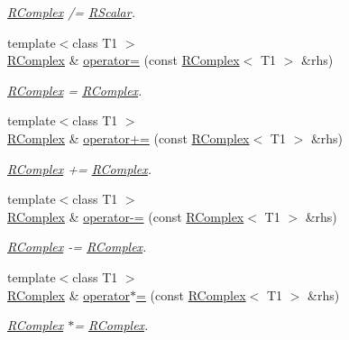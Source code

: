 \begin{DoxyCompactItemize}
\begin{DoxyCompactList}\small\item\em \mbox{\hyperlink{classENSEM_1_1RComplex}{R\+Complex}} /= \mbox{\hyperlink{classENSEM_1_1RScalar}{R\+Scalar}}. \end{DoxyCompactList}\item 
{\footnotesize template$<$class T1 $>$ }\\\mbox{\hyperlink{classENSEM_1_1RComplex}{R\+Complex}} \& \mbox{\hyperlink{classENSEM_1_1RComplex_a14a5d3857ebb326ed5f211cc30da3ced}{operator=}} (const \mbox{\hyperlink{classENSEM_1_1RComplex}{R\+Complex}}$<$ T1 $>$ \&rhs)
\begin{DoxyCompactList}\small\item\em \mbox{\hyperlink{classENSEM_1_1RComplex}{R\+Complex}} = \mbox{\hyperlink{classENSEM_1_1RComplex}{R\+Complex}}. \end{DoxyCompactList}\item 
{\footnotesize template$<$class T1 $>$ }\\\mbox{\hyperlink{classENSEM_1_1RComplex}{R\+Complex}} \& \mbox{\hyperlink{classENSEM_1_1RComplex_aca53957ad00d064844898e907e6f6fab}{operator+=}} (const \mbox{\hyperlink{classENSEM_1_1RComplex}{R\+Complex}}$<$ T1 $>$ \&rhs)
\begin{DoxyCompactList}\small\item\em \mbox{\hyperlink{classENSEM_1_1RComplex}{R\+Complex}} += \mbox{\hyperlink{classENSEM_1_1RComplex}{R\+Complex}}. \end{DoxyCompactList}\item 
{\footnotesize template$<$class T1 $>$ }\\\mbox{\hyperlink{classENSEM_1_1RComplex}{R\+Complex}} \& \mbox{\hyperlink{classENSEM_1_1RComplex_aa2ad7391f0a0df5381ae7402b8b1fdb8}{operator-\/=}} (const \mbox{\hyperlink{classENSEM_1_1RComplex}{R\+Complex}}$<$ T1 $>$ \&rhs)
\begin{DoxyCompactList}\small\item\em \mbox{\hyperlink{classENSEM_1_1RComplex}{R\+Complex}} -\/= \mbox{\hyperlink{classENSEM_1_1RComplex}{R\+Complex}}. \end{DoxyCompactList}\item 
{\footnotesize template$<$class T1 $>$ }\\\mbox{\hyperlink{classENSEM_1_1RComplex}{R\+Complex}} \& \mbox{\hyperlink{classENSEM_1_1RComplex_a9b5f1c26c1d2cca0a3a0a6d38b5e49bd}{operator$\ast$=}} (const \mbox{\hyperlink{classENSEM_1_1RComplex}{R\+Complex}}$<$ T1 $>$ \&rhs)
\begin{DoxyCompactList}\small\item\em \mbox{\hyperlink{classENSEM_1_1RComplex}{R\+Complex}} $\ast$= \mbox{\hyperlink{classENSEM_1_1RComplex}{R\+Complex}}. \end{DoxyCompactList}\item 

\end{DoxyCompactItemize}
